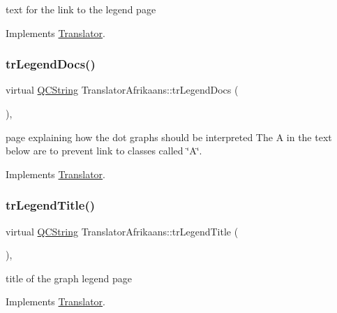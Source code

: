 text for the link to the legend page 

Implements \mbox{\hyperlink{class_translator}{Translator}}.

\mbox{\label{class_translator_afrikaans_aa6a6462a855e1c8f4ea6a8d686bf0705}} 
\subsubsection{\texorpdfstring{trLegendDocs()}{trLegendDocs()}}
{\footnotesize\ttfamily virtual \mbox{\hyperlink{class_q_c_string}{Q\+C\+String}} Translator\+Afrikaans\+::tr\+Legend\+Docs (\begin{DoxyParamCaption}{ }\end{DoxyParamCaption})\hspace{0.3cm}{\ttfamily [inline]}, {\ttfamily [virtual]}}

page explaining how the dot graph\textquotesingle{}s should be interpreted The A in the text below are to prevent link to classes called \char`\"{}\+A\char`\"{}. 

Implements \mbox{\hyperlink{class_translator}{Translator}}.

\mbox{\label{class_translator_afrikaans_a5b93f615f44941ede78301a8dc714427}} 
\subsubsection{\texorpdfstring{trLegendTitle()}{trLegendTitle()}}
{\footnotesize\ttfamily virtual \mbox{\hyperlink{class_q_c_string}{Q\+C\+String}} Translator\+Afrikaans\+::tr\+Legend\+Title (\begin{DoxyParamCaption}{ }\end{DoxyParamCaption})\hspace{0.3cm}{\ttfamily [inline]}, {\ttfamily [virtual]}}

title of the graph legend page 

Implements \mbox{\hyperlink{class_translator}{Translator}}.

\mbox{\label{class_translator_afrikaans_a3c72a7389b9b02ef5cb387bbe9382446}} 
